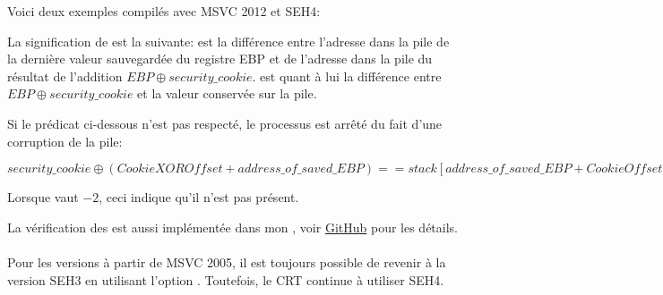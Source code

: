 \def\SEHfour{1}


Voici deux exemples compilés avec MSVC 2012 et SEH4:





La signification de  est la suivante:  est la différence entre l'adresse 
dans la pile de la dernière valeur sauvegardée du registre EBP et de l'adresse dans la pile du 
résultat de l'addition $EBP \oplus security\_cookie$.
 est quant à lui la différence entre $EBP \oplus security\_cookie$ et la valeur 
conservée sur la pile.

Si le prédicat ci-dessous n'est pas respecté, le processus est arrêté du fait d'une corruption 
de la pile:

\begin{center}
$security\_cookie \oplus (CookieXOROffset + address\_of\_saved\_EBP) == stack[address\_of\_saved\_EBP + CookieOffset]$
\end{center}

Lorsque  vaut $-2$, ceci indique qu'il n'est pas présent.

La vérification des  est aussi implémentée dans mon \tracer{},
voir \href{http://go.yurichev.com/17061}{GitHub} pour les détails.\\
\\
Pour les versions à partir de MSVC 2005, il est toujours possible de revenir à la version SEH3 
en utilisant l'option . Toutefois, le \ac{CRT} continue à utiliser SEH4.

